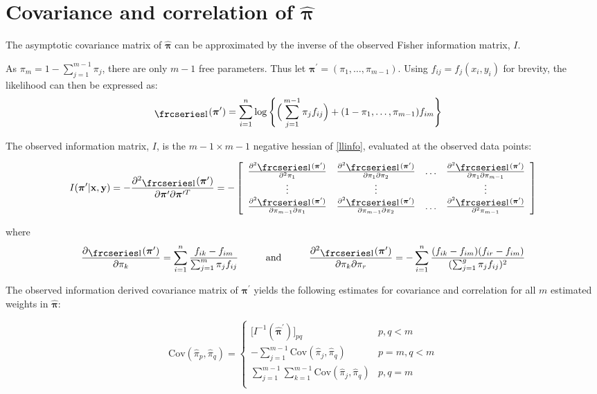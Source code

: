 \documentclass[12pt]{amsart}
\newcommand{\textfrc}[1]{{\frcseries#1}}
\newcommand{\mathfrc}[1]{\raisebox{-0.8mm}{\text{\textfrc{\small #1}}}\hspace{0.4mm}}
\newcommand{\vect}[1]{\boldsymbol{\mathbf{#1}}}
\newcommand{\eqn}[1]{\begin{align*}
#1
\end{align*}}
\newcommand{\eqnl}[2]{\begin{align} \label{#1}
#2
\end{align}}
\newcommand{\mtx}[4]{
\[
#1 = #2
\left[ {\begin{array}{#3}
 #4
 \end{array} } \right]
\]
}
\newcommand{\eqnset}[4]{
\[ #1 = #2 \left\{ \begin{array}{#3}
        #4
\end{array} \right. \] 
}
\newcommand{\vx}{\vect{x}}
\newcommand{\vy}{\vect{y}}
\newcommand{\vp}{\vect{\pi}}
\newcommand{\vph}{\hat{\vect{\pi}}}
\newcommand{\pims}{1-\pi_1,\ldots,\pi_{m-1}}
\newcommand{\hessllg}[2]{\sumn \frac{f_{#1}}{(\sumg \pi_j f_j)^2 f_{#2}}}
\newcommand{\hesslld}[2]{\frac{\partial^2 \llpp}{\partial \pi_{#1} \partial \pi_{#2}}}
\newcommand{\sumn}{\sum^n_{i=1}}
\newcommand{\summ}{\sum^m_{j=1}}
\newcommand{\summo}{\sum^{m-1}_{j=1}}
\newcommand{\sumg}{\sum^g_{j=1}}
\newcommand{\vpg}{\vp^{\prime}}
\newcommand{\vpgh}{\hat{\vp}^{\prime}}
\newcommand{\llpp}{\mathfrc{l}(\vpg)}
\begin{document}
\clearpage
\section{Covariance and correlation of $\vph$}
The asymptotic covariance matrix of $\vph$ can be approximated by the inverse of the observed Fisher information matrix, $I$.

As $\pi_m = 1-\sum_{j=1}^{m-1}\pi_j$, there are only $m-1$ free parameters. Thus let $\vpg=(\pi_1,\ldots,\pi_{m-1})$. Using $f_{ij} = f_j(x_i,y_i)$ for brevity, the likelihood can then be expressed as:
\eqnl{llinfo}{
	\llpp &= \sumn \log \Bigg\{ \Big( \summo \pi_{j} f_{ij} \Big) + (\pims)f_{im} \Bigg\}	
}



The observed information matrix, $I$, is the $m-1\times m-1$ negative hessian of \eqref{llinfo}, evaluated at the observed data points:

\mtx{I(\vpg|\vx,\vy)=-\frac{\partial^2 \llpp}{\partial \vp^\prime \partial \vp^{\prime T}}}{-}{cccc}{
	\frac{\partial^2 \llpp}{\partial^2 \pi_1} & \hesslld{1}{2} & \ldots & \hesslld{1}{m-1}	\\
	\vdots & \vdots & & \vdots	\\
	\hesslld{m-1}{1} & \hesslld{m-1}{2} & \ldots & \frac{\partial^2 \llpp}{\partial^2 \pi_{m-1}}
}



where
\eqn{
	\frac{\partial \llpp}{\partial \pi_k} = \sumn \frac{f_{ik} - f_{im}}{\summ \pi_j f_{ij}}	\hspace{10mm}\text{and}\hspace{10mm}	\frac{\partial^2 \llpp}{\partial \pi_k \partial \pi_r} = -\sumn \frac{(f_{ik}-f_{im}) (f_{ir}-f_{im})}{(\sumg \pi_j f_{ij})^2}
}




The observed information derived covariance matrix of $\vpg$ yields the following estimates for covariance and correlation for all $m$ estimated weights in $\vph$:

\eqnset{\text{Cov}(\hat{\pi}_p,\hat{\pi}_q)}{}{ll}{
	\big[I^{-1}(\vpgh) \big]_{pq}				& p,q<m	\\
	-\sum\limits_{j=1}^{m-1} \text{Cov}(\hat{\pi}_j,\hat{\pi}_q)		& p=m,q<m	\\
	\sum\limits_{j=1}^{m-1} \sum\limits_{k=1}^{m-1} \text{Cov}(\hat{\pi}_j,\hat{\pi}_q)		& p, q=m	\\
}
\end{document}
